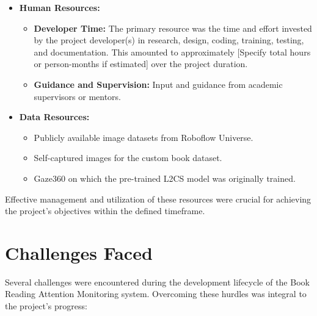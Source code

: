 \begin{itemize}
    \item \textbf{Human Resources:}
    \begin{itemize}
        \item \textbf{Developer Time:} The primary resource was the time and effort invested by the project developer(s) in research, design, coding, training, testing, and documentation. This amounted to approximately [Specify total hours or person-months if estimated] over the project duration.
        \item \textbf{Guidance and Supervision:} Input and guidance from academic supervisors or mentors.
    \end{itemize}

    \item \textbf{Data Resources:}
    \begin{itemize}
        \item Publicly available image datasets from Roboflow Universe.
        \item Self-captured images for the custom book dataset.
        \item Gaze360 on which the pre-trained L2CS model was originally trained.
    \end{itemize}
\end{itemize}
Effective management and utilization of these resources were crucial for achieving the project's objectives within the defined timeframe.

\section{Challenges Faced}
Several challenges were encountered during the development lifecycle of the Book Reading Attention Monitoring system. Overcoming these hurdles was integral to the project's progress:

